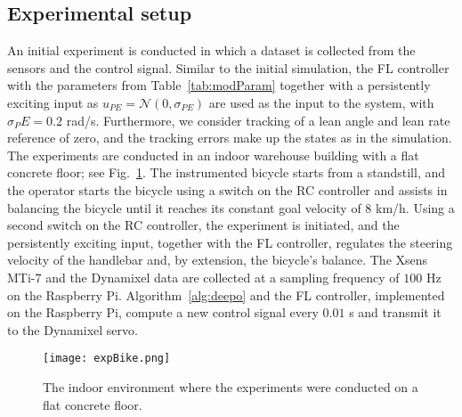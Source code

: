 \subsection{Experimental setup} 
An initial experiment is conducted in which a dataset is collected from the sensors and the control signal. Similar to the initial simulation, the FL controller with the parameters from Table~\ref{tab:modParam} together with a persistently exciting input as $u_{PE} = \mathcal{N}(0,\sigma_{PE})$ are used as the input to the system, with $\sigma_PE=0.2$ rad/s. Furthermore, we consider tracking of a lean angle and lean rate reference of zero, and the tracking errors make up the states as in the simulation. The experiments are conducted in an indoor warehouse building with a flat concrete floor; see Fig.~\ref{fig:expBike}. The instrumented bicycle starts from a standstill, and the operator starts the bicycle using a switch on the RC controller and assists in balancing the bicycle until it reaches its constant goal velocity of $8$ km/h. Using a second switch on the RC controller, the experiment is initiated, and the persistently exciting input, together with the FL controller, regulates the steering velocity of the handlebar and, by extension, the bicycle's balance. The Xsens MTi-7 and the Dynamixel data are collected at a sampling frequency of $100$ Hz on the Raspberry Pi. Algorithm~\ref{alg:deepo} and the FL controller, implemented on the Raspberry Pi, compute a new control signal every $0.01$ s and transmit it to the Dynamixel servo. 

\begin{figure}[t]
    \centering
    \texttt{[image: expBike.png]}
    \caption{The indoor environment where the experiments were conducted on a flat concrete floor.}
    \label{fig:expBike}
\end{figure}

